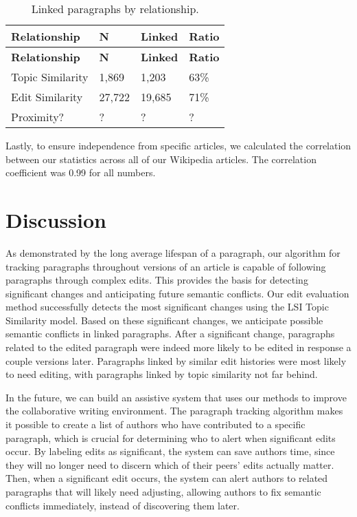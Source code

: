 \begin{longtable}[c]{@{}llll@{}}
\caption{Linked paragraphs by relationship.{}}\tabularnewline
\toprule
\textbf{Relationship} & \textbf{N} & \textbf{Linked} &
\textbf{Ratio}\tabularnewline
\midrule
\endfirsthead
\toprule
\textbf{Relationship} & \textbf{N} & \textbf{Linked} &
\textbf{Ratio}\tabularnewline
\midrule
\endhead
Topic Similarity & 1,869 & 1,203 & 63\%\tabularnewline
Edit Similarity & 27,722 & 19,685 & 71\%\tabularnewline
Proximity? & ? & ? & ?\tabularnewline
\bottomrule
\end{longtable}

Lastly, to ensure independence from specific articles, we calculated the
correlation between our statistics across all of our Wikipedia articles.
The correlation coefficient was 0.99 for all numbers.

\section{Discussion}\label{discussion}

As demonstrated by the long average lifespan of a paragraph, our
algorithm for tracking paragraphs throughout versions of an article is
capable of following paragraphs through complex edits. This provides the
basis for detecting significant changes and anticipating future semantic
conflicts. Our edit evaluation method successfully detects the most
significant changes using the LSI Topic Similarity model. Based on these
significant changes, we anticipate possible semantic conflicts in linked
paragraphs. After a significant change, paragraphs related to the edited
paragraph were indeed more likely to be edited in response a couple
versions later. Paragraphs linked by similar edit histories were most
likely to need editing, with paragraphs linked by topic similarity not
far behind.

In the future, we can build an assistive system that uses our methods to
improve the collaborative writing environment. The paragraph tracking
algorithm makes it possible to create a list of authors who have
contributed to a specific paragraph, which is crucial for determining
who to alert when significant edits occur. By labeling edits as
significant, the system can save authors time, since they will no longer
need to discern which of their peers' edits actually matter. Then, when
a significant edit occurs, the system can alert authors to related
paragraphs that will likely need adjusting, allowing authors to fix
semantic conflicts immediately, instead of discovering them later.

